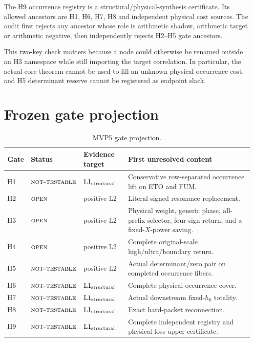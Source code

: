 \documentclass[11pt]{article}
\theoremstyle{definition}
\theoremstyle{remark}
\newcommand{\Lone}{\mathrm{L1}}
\newcommand{\Ltwo}{\mathrm{L2}}
\newcommand{\NT}{\textnormal{\textsc{not-testable}}}
\newcommand{\OPEN}{\textnormal{\textsc{open}}}
\begin{document}
The H9 occurrence registry is a structural/physical-synthesis
certificate.  Its allowed ancestors are H1, H6, H7, H8 and independent
physical cost sources.  The audit first rejects any ancestor whose
role is arithmetic shadow, arithmetic target or arithmetic negative,
then independently rejects H2--H5 gate ancestors.

This two-key check matters because a node could otherwise be renamed
outside an H3 namespace while still importing the target
correlation.  In particular, the actual-core theorem cannot be used
to fill an unknown physical occurrence cost, and H5 determinant
reserve cannot be registered as endpoint slack.

\section{Frozen gate projection}

\begin{table}[htbp]
\centering
\small
\caption{MVP5 gate projection.}
\label{tab:gates}
\begin{tabularx}{\textwidth}{@{}P{0.07\textwidth}P{0.19\textwidth}
P{0.21\textwidth}Y@{}}
\toprule
Gate & Status & Evidence target & First unresolved content\\
\midrule
H1 & \(\NT\) & \(\Lone_{\rm structural}\) &
Conservative row-separated occurrence lift on ETO and FUM.\\
H2 & \(\OPEN\) & positive \(\Ltwo\) &
Literal signed resonance replacement.\\
H3 & \(\OPEN\) & positive \(\Ltwo\) &
Physical weight, generic phase, all-prefix selector, four-sign return,
and a fixed-\(X\)-power saving.\\
H4 & \(\OPEN\) & positive \(\Ltwo\) &
Complete original-scale high/ultra/boundary return.\\
H5 & \(\NT\) & positive \(\Ltwo\) &
Actual determinant/zero pair on completed occurrence fibers.\\
H6 & \(\NT\) & \(\Lone_{\rm structural}\) &
Complete physical occurrence cover.\\
H7 & \(\NT\) & \(\Lone_{\rm structural}\) &
Actual downstream fixed-\(h_0\) totality.\\
H8 & \(\NT\) & \(\Lone_{\rm structural}\) &
Exact hard-packet reconnection.\\
H9 & \(\NT\) & \(\Lone_{\rm structural}\) &
Complete independent registry and physical-loss upper certificate.\\
\bottomrule
\end{tabularx}
\end{table}
\end{document}
